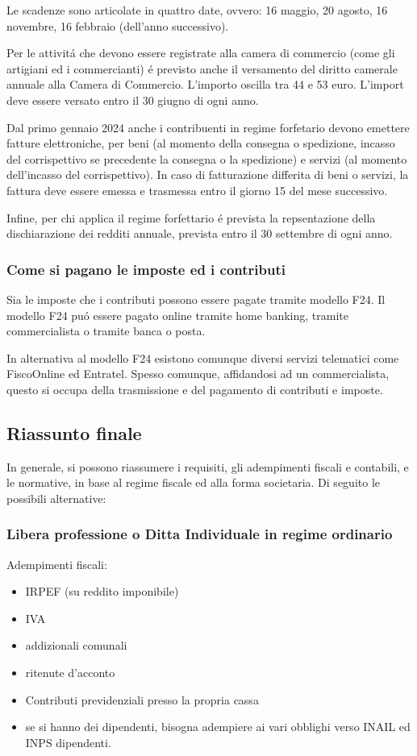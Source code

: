 \documentclass{article}
\begin{document}
Le scadenze sono articolate in quattro date, ovvero: 16 maggio, 20 agosto, 16 novembre, 16 febbraio (dell'anno successivo).

Per le attivit\'a che devono essere registrate alla camera di commercio (come gli artigiani ed i commercianti) \'e previsto anche il versamento del diritto camerale annuale alla Camera di Commercio. L'importo oscilla tra 44 e 53 euro. L'import deve essere versato entro il 30 giugno di ogni anno.

Dal primo gennaio 2024 anche i contribuenti in regime forfetario devono emettere fatture elettroniche, per beni (al momento della consegna o spedizione, incasso del corrispettivo se precedente la consegna o la spedizione)
e servizi (al momento dell'incasso del corrispettivo). In caso di fatturazione differita di beni o servizi, la fattura deve essere emessa e trasmessa entro il giorno 15 del mese successivo.

Infine, per chi applica il regime forfettario \'e prevista la repsentazione della dischiarazione dei redditi annuale, prevista entro il 30 settembre di ogni anno. 

\subsubsection{Come si pagano le imposte ed i contributi}
Sia le imposte che i contributi possono essere pagate tramite modello F24. 
Il modello F24 pu\'o essere pagato online tramite home banking, tramite commercialista o tramite banca o posta.

In alternativa al modello F24 esistono comunque diversi servizi telematici come FiscoOnline ed Entratel. Spesso comunque, affidandosi ad un commercialista, questo si occupa della trasmissione e del pagamento di contributi e imposte.

\subsection{Riassunto finale}

In generale, si possono riassumere i requisiti, gli adempimenti fiscali e contabili, e le normative, in base al regime fiscale ed alla forma societaria. Di seguito le possibili alternative:

\subsubsection{Libera professione o Ditta Individuale in regime ordinario}
Adempimenti fiscali:
\begin{itemize}
    \item IRPEF (su reddito imponibile)
    \item IVA
    \item addizionali comunali
    \item ritenute d'acconto
    \item Contributi previdenziali presso la propria cassa
    \item se si hanno dei dipendenti, bisogna adempiere ai vari obblighi verso INAIL ed INPS dipendenti.
\end{itemize}
\end{document}
